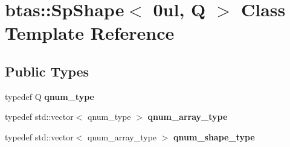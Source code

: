 \hypertarget{classbtas_1_1_sp_shape_3_010ul_00_01_q_01_4}{
\section{btas::SpShape$<$ 0ul, Q $>$ Class Template Reference}
\label{classbtas_1_1_sp_shape_3_010ul_00_01_q_01_4}
}
\subsection*{Public Types}
\begin{DoxyCompactItemize}
\item 
\hypertarget{classbtas_1_1_sp_shape_3_010ul_00_01_q_01_4_ac92d637d42a221de1ab755e99ba4c912}{
typedef Q {\bfseries qnum\_\-type}}
\label{classbtas_1_1_sp_shape_3_010ul_00_01_q_01_4_ac92d637d42a221de1ab755e99ba4c912}

\item 
\hypertarget{classbtas_1_1_sp_shape_3_010ul_00_01_q_01_4_ad1200359d253696239f03db6060f841e}{
typedef std::vector$<$ qnum\_\-type $>$ {\bfseries qnum\_\-array\_\-type}}
\label{classbtas_1_1_sp_shape_3_010ul_00_01_q_01_4_ad1200359d253696239f03db6060f841e}

\item 
\hypertarget{classbtas_1_1_sp_shape_3_010ul_00_01_q_01_4_a8ada773c90821671387b565088403624}{
typedef std::vector$<$ qnum\_\-array\_\-type $>$ {\bfseries qnum\_\-shape\_\-type}}
\label{classbtas_1_1_sp_shape_3_010ul_00_01_q_01_4_a8ada773c90821671387b565088403624}

\end{DoxyCompactItemize}
